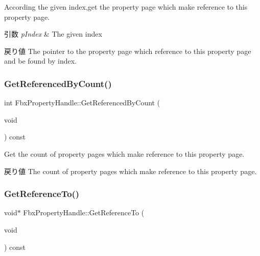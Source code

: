 According the given index,get the property page which make reference to this property page. 
\begin{DoxyParams}{引数}
{\em p\+Index} & The given index \\
\hline
\end{DoxyParams}
\begin{DoxyReturn}{戻り値}
The pointer to the property page which reference to this property page and be found by index. 
\end{DoxyReturn}
\mbox{\label{class_fbx_property_handle_ac5fb2c38abc682f2151960ed4286f3ca}} 
\subsubsection{\texorpdfstring{Get\+Referenced\+By\+Count()}{GetReferencedByCount()}}
{\footnotesize\ttfamily int Fbx\+Property\+Handle\+::\+Get\+Referenced\+By\+Count (\begin{DoxyParamCaption}\item[{void}]{ }\end{DoxyParamCaption}) const}

Get the count of property pages which make reference to this property page. \begin{DoxyReturn}{戻り値}
The count of property pages which make reference to this property page. 
\end{DoxyReturn}
\mbox{\label{class_fbx_property_handle_af9780300940a75d036215b70e67698ac}} 
\subsubsection{\texorpdfstring{Get\+Reference\+To()}{GetReferenceTo()}}
{\footnotesize\ttfamily void$\ast$ Fbx\+Property\+Handle\+::\+Get\+Reference\+To (\begin{DoxyParamCaption}\item[{void}]{ }\end{DoxyParamCaption}) const}

